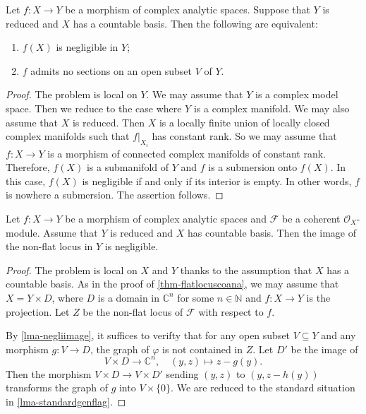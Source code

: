 \begin{lemma}\label{lma-negliimage}
    Let $f:X\rightarrow Y$ be a morphism of complex analytic spaces. Suppose that $Y$ is reduced and $X$ has a countable basis. Then the following are equivalent:
    \begin{enumerate}
        \item $f(X)$ is negligible in $Y$;
        \item $f$ admits no sections on an open subset $V$ of $Y$.
    \end{enumerate}
\end{lemma}
\begin{proof}
   The problem is local on $Y$. We may assume that $Y$ is a complex model space. Then we reduce to the case where $Y$ is a complex manifold. We may also assume that $X$ is reduced. Then $X$ is a locally finite union of locally closed complex manifolds such that $f|_{X_i}$ has constant rank. So we may assume that $f:X\rightarrow Y$ is a morphism of connected complex manifolds of constant rank. Therefore, $f(X)$ is a submanifold of $Y$ and $f$ is a submersion onto $f(X)$. In this case, $f(X)$ is negligible if and only if its interior is empty. In other words, $f$ is nowhere a submersion. The assertion follows.
\end{proof}

\begin{theorem}
    Let $f:X\rightarrow Y$ be a morphism of complex analytic spaces and $\mathcal{F}$ be a coherent $\mathcal{O}_X$-module. Assume that $Y$ is reduced and $X$ has countable basis. Then the image of the non-flat locus in $Y$ is negligible.
\end{theorem}
\begin{proof}
    The problem is local on $X$ and $Y$ thanks to the assumption that $X$ has a countable basis. As in the proof of \cref{thm-flatlocuscoana}, we may assume that $X=Y\times D$, where $D$ is a domain in $\mathbb{C}^n$ for some $n\in \mathbb{N}$ and $f:X\rightarrow Y$ is the projection. Let $Z$ be the non-flat locus of $\mathcal{F}$ with respect to $f$.

    By \cref{lma-negliimage}, it suffices to verifty that for any open subset $V\subseteq Y$ and any morphism $g:V\rightarrow D$, the graph of $\varphi$ is not contained in $Z$. Let $D'$ be the image of 
    \[
        V\times D\rightarrow \mathbb{C}^n,\quad (y,z)\mapsto z-g(y).  
    \]
    Then the morphism $V\times D\rightarrow V\times D'$ sending $(y,z)$ to $(y,z-h(y))$ transforms the graph of $g$ into $V\times \{0\}$. We are reduced to the standard situation in \cref{lma-standardgenflag}.
\end{proof}


